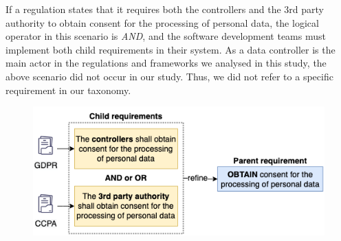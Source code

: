 If a regulation states that it requires both the controllers and the 3rd party authority to obtain consent for the processing of personal data, the logical operator in this scenario is \textit{AND}, and the software development teams must implement both child requirements in their system. As a data controller is the main actor in the regulations and frameworks we analysed in this study, the above scenario did not occur in our study. Thus, we did not refer to a specific requirement in our taxonomy.

\begin{figure}[h]
	\centering
	\includegraphics[width=1\linewidth]{"Figures/different-actors"}
	\caption{}
	\label{fig:different-actors}
\end{figure}

\vspace{-4mm}

